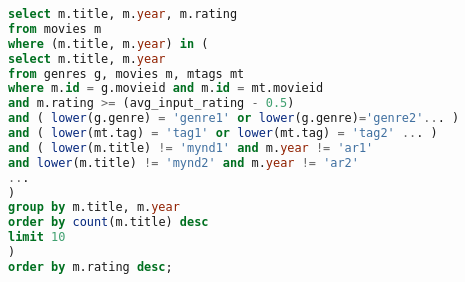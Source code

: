 \documentclass[12pt, git, final]{rureport}
\begin{document}
\begin{lstlisting}[language = SQL, caption = Finna líkar myndir, label = lst:simmovies]
select m.title, m.year, m.rating
from movies m
where (m.title, m.year) in (
select m.title, m.year
from genres g, movies m, mtags mt
where m.id = g.movieid and m.id = mt.movieid
and m.rating >= (avg_input_rating - 0.5)
and ( lower(g.genre) = 'genre1' or lower(g.genre)='genre2'... )
and ( lower(mt.tag) = 'tag1' or lower(mt.tag) = 'tag2' ... )
and ( lower(m.title) != 'mynd1' and m.year != 'ar1'
and lower(m.title) != 'mynd2' and m.year != 'ar2'
...
)
group by m.title, m.year
order by count(m.title) desc
limit 10
)
order by m.rating desc;
\end{lstlisting}


\clearpage
\printbibliography
\end{document}

